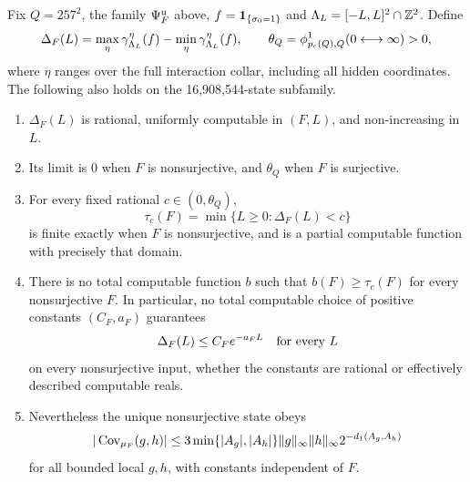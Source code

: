 \begin{theorem}\label{thm:boundary-scale}
Fix $Q=257^2$, the family $\Psi_F^{\rm u}$ above, $f=\mathbf 1_{\{\sigma_0=1\}}$ and $\Lambda_L=[-L,L]^2\cap\mathbb Z^2$. Define
\[
 \Delta_F(L)=\max_\eta\gamma_{\Lambda_L}^{\eta}(f)
                    -\min_\eta\gamma_{\Lambda_L}^{\eta}(f),\qquad
 \theta_Q=\phi^1_{p_c(Q),Q}(0\longleftrightarrow\infty)>0,
\]
where $\eta$ ranges over the full interaction collar, including all hidden coordinates. The following also holds on the 16,908,544-state subfamily.
\begin{enumerate}[label=(\arabic*)]
\item $\Delta_F(L)$ is rational, uniformly computable in $(F,L)$, and non-increasing in $L$.
\item Its limit is $0$ when $F$ is nonsurjective, and $\theta_Q$ when $F$ is surjective.
\item For every fixed rational $c\in(0,\theta_Q)$,
\[
 \tau_c(F)=\min\{L\ge0:\Delta_F(L)<c\}
\]
is finite exactly when $F$ is nonsurjective, and is a partial computable function with precisely that domain.
\item There is no total computable function $b$ such that $b(F)\ge\tau_c(F)$ for every nonsurjective $F$. In particular, no total computable choice of positive constants $(C_F,a_F)$ guarantees
\[
 \Delta_F(L)\le C_F e^{-a_FL}\quad\hbox{for every }L
\]
on every nonsurjective input, whether the constants are rational or effectively described computable reals.
\item Nevertheless the unique nonsurjective state obeys
\[
 |\operatorname{Cov}_{\mu_F}(g,h)|\le
 3\min\{|A_g|,|A_h|\}\|g\|_\infty\|h\|_\infty
 2^{-d_1(A_g,A_h)}
\]
for all bounded local $g,h$, with constants independent of $F$.
\end{enumerate}
\end{theorem}
